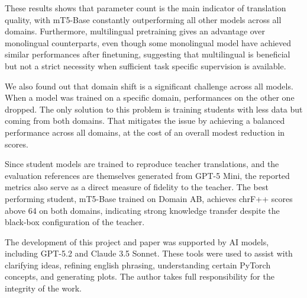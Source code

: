 \documentclass[pdflatex,sn-mathphys-num]{sn-jnl}%
\theoremstyle{thmstyleone}%
\theoremstyle{thmstyletwo}%
\theoremstyle{thmstylethree}%
\begin{document}
These results shows that parameter count is the main indicator of translation quality, with mT5-Base constantly outperforming all other models across all domains. Furthermore, multilingual pretraining gives an advantage over monolingual counterparts, even though some monolingual model have achieved similar performances after finetuning, suggesting that multilingual is beneficial but not a strict necessity when sufficient task specific supervision is available.

We also found out that domain shift is a significant challenge across all models. When a model was trained on a specific domain, performances on the other one dropped. The only solution to this problem is training students with less data but coming from both domains. That mitigates the issue by achieving a balanced performance across all domains, at the cost of an overall modest reduction in scores.

Since student models are trained to reproduce teacher translations, and the evaluation references are themselves generated from GPT-5 Mini, the reported metrics also serve as a direct measure of fidelity to the teacher. The best performing student, mT5-Base trained on Domain AB, achieves chrF++ scores above 64 on both domains, indicating strong knowledge transfer despite the black-box configuration of the teacher.


The development of this project and paper was supported by AI models, including GPT-5.2 and Claude 3.5 Sonnet. These tools were used to assist with clarifying ideas, refining english phrasing, understanding certain PyTorch concepts, and generating plots. The author takes full responsibility for the integrity of the work.


\end{document}
